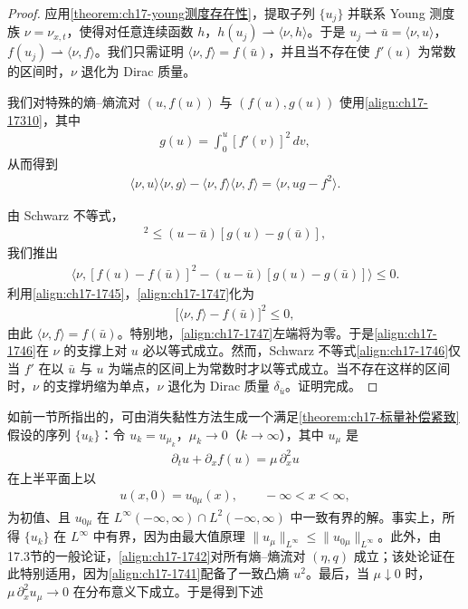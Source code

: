 \documentclass[../../main.tex]{subfiles}
\begin{document}
\begin{proof}
应用\cref{theorem:ch17-young测度存在性}，提取子列 $\{u_j\}$ 并联系 Young 测度族 $\nu=\nu_{x,t}$，使得对任意连续函数 $h$，$h(u_j)\rightharpoonup\langle\nu,h\rangle$。于是 $u_j\rightharpoonup\bar u=\langle\nu,u\rangle$，$f(u_j)\rightharpoonup\langle\nu,f\rangle$。我们只需证明 $\langle\nu,f\rangle=f(\bar u)$，并且当不存在使 $f'(u)$ 为常数的区间时，$\nu$ 退化为 Dirac 质量。

我们对特殊的熵--熵流对 $(u,f(u))$ 与 $(f(u),g(u))$ 使用\eqref{align:ch17-17310}，其中
\begin{align}
g(u)=\int_0^u[f'(v)]^2\,dv,
\label{align:ch17-1744}
\end{align}
从而得到
\begin{align}
\langle\nu,u\rangle\langle\nu,g\rangle-\langle\nu,f\rangle\langle\nu,f\rangle=\langle\nu,ug-f^2\rangle.
\label{align:ch17-1745}
\end{align}

由 Schwarz 不等式，
\begin{align}
[f(u)-f(\bar u)]^2\leqslant(u-\bar u)[g(u)-g(\bar u)],
\label{align:ch17-1746}
\end{align}
我们推出
\begin{align}
\bigl\langle\nu,[f(u)-f(\bar u)]^2-(u-\bar u)[g(u)-g(\bar u)]\bigr\rangle\leqslant0.
\label{align:ch17-1747}
\end{align}
利用\eqref{align:ch17-1745}，\eqref{align:ch17-1747}化为%
\begin{align}
\bigl[\langle\nu,f\rangle-f(\bar u)\bigr]^2\leqslant0,
\label{align:ch17-1748}
\end{align}
由此 $\langle\nu,f\rangle=f(\bar u)$。特别地，\eqref{align:ch17-1747}左端将为零。于是\eqref{align:ch17-1746}在 $\nu$ 的支撑上对 $u$ 必以等式成立。然而，Schwarz 不等式\eqref{align:ch17-1746}仅当 $f'$ 在以 $\bar u$ 与 $u$ 为端点的区间上为常数时才以等式成立。当不存在这样的区间时，$\nu$ 的支撑坍缩为单点，$\nu$ 退化为 Dirac 质量 $\delta_{\bar u}$。证明完成。
\end{proof}

如前一节所指出的，可由消失黏性方法生成一个满足\cref{theorem:ch17-标量补偿紧致}假设的序列 $\{u_k\}$：令 $u_k=u_{\mu_k}$，$\mu_k\to0$（$k\to\infty$），其中 $u_\mu$ 是
\begin{align}
\partial_t u+\partial_x f(u)=\mu\,\partial_x^2u
\label{align:ch17-1749}
\end{align}
在上半平面上以
\begin{align}
u(x,0)=u_{0\mu}(x),\qquad-\infty<x<\infty,
\label{align:ch17-17410}
\end{align}
为初值、且 $u_{0\mu}$ 在 $L^\infty(-\infty,\infty)\cap L^2(-\infty,\infty)$ 中一致有界的解。事实上，所得 $\{u_k\}$ 在 $L^\infty$ 中有界，因为由最大值原理 $\|u_\mu\|_{L^\infty}\leqslant\|u_{0\mu}\|_{L^\infty}$。此外，由17.3节的一般论证，\eqref{align:ch17-1742}对所有熵--熵流对 $(\eta,q)$ 成立；该处论证在此特别适用，因为\eqref{align:ch17-1741}配备了一致凸熵 $u^2$。最后，当 $\mu\downarrow0$ 时，$\mu\,\partial_x^2u_\mu\to0$ 在分布意义下成立。于是得到下述
\end{document}

